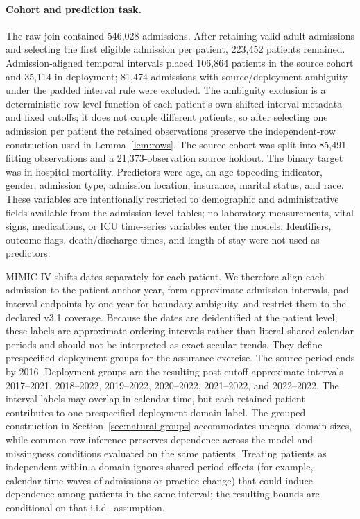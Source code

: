 \documentclass[twoside,11pt]{article}
\begin{document}
\paragraph{Cohort and prediction task.}
The raw join contained 546,028 admissions. After retaining valid adult admissions and selecting
the first eligible admission per patient, 223,452 patients remained. Admission-aligned temporal
intervals placed 106,864 patients in the source cohort and 35,114 in deployment; 81,474
admissions with source/deployment ambiguity under the padded interval rule were excluded.
The ambiguity exclusion is a deterministic row-level function of each patient's own shifted
interval metadata and fixed cutoffs; it does not couple different patients, so after selecting
one admission per patient the retained observations preserve the independent-row construction
used in Lemma~\ref{lem:rows}. The source cohort was split into 85,491 fitting observations and a
21,373-observation source holdout. The binary target was in-hospital mortality. Predictors were
age, an age-topcoding indicator, gender, admission type, admission location, insurance, marital
status, and race. These variables are intentionally restricted to demographic and administrative
fields available from the admission-level tables; no laboratory measurements, vital signs,
medications, or ICU time-series variables enter the models. Identifiers, outcome flags,
death/discharge times, and length of stay were not used as predictors.

MIMIC-IV shifts dates separately for each patient. We therefore align each admission to the
patient anchor year, form approximate admission intervals, pad interval endpoints by one year
for boundary ambiguity, and restrict them to the declared v3.1 coverage. Because the dates are
deidentified at the patient level, these labels are approximate ordering intervals rather than
literal shared calendar periods and should not be interpreted as exact secular trends. They
define prespecified deployment groups for the assurance exercise. The source period ends by
2016. Deployment groups are the resulting post-cutoff approximate intervals
2017--2021, 2018--2022, 2019--2022, 2020--2022, 2021--2022, and 2022--2022.
The interval labels may overlap in calendar time, but each retained patient contributes to
one prespecified deployment-domain label. The grouped construction in
Section~\ref{sec:natural-groups} accommodates unequal domain sizes, while common-row inference
preserves dependence across the model and missingness conditions evaluated on the same patients.
Treating patients as independent within a domain ignores shared period effects (for example,
calendar-time waves of admissions or practice change) that could induce dependence among
patients in the same interval; the resulting bounds are conditional on that i.i.d.\ assumption.
\end{document}
